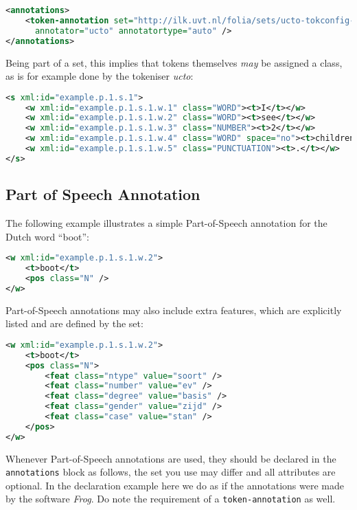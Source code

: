 \documentclass[a4paper,12pt]{report}
\begin{document}
\begin{lstlisting}[language=xml]
<annotations>
    <token-annotation set="http://ilk.uvt.nl/folia/sets/ucto-tokconfig-nl"
      annotator="ucto" annotatortype="auto" />
</annotations>
\end{lstlisting}

Being part of a set, this implies that tokens themselves \emph{may} be assigned a class, as is for example done by the tokeniser \emph{ucto}:

\begin{lstlisting}[language=xml]
<s xml:id="example.p.1.s.1">
    <w xml:id="example.p.1.s.1.w.1" class="WORD"><t>I</t></w>
    <w xml:id="example.p.1.s.1.w.2" class="WORD"><t>see</t></w>
    <w xml:id="example.p.1.s.1.w.3" class="NUMBER"><t>2</t></w>
    <w xml:id="example.p.1.s.1.w.4" class="WORD" space="no"><t>children</t></w>
    <w xml:id="example.p.1.s.1.w.5" class="PUNCTUATION"><t>.</t></w>
</s>
\end{lstlisting}        


\subsection{Part of Speech Annotation}

The following example illustrates a simple Part-of-Speech annotation for the Dutch word ``boot'':

\begin{lstlisting}[language=xml]
<w xml:id="example.p.1.s.1.w.2">
    <t>boot</t>
    <pos class="N" />
</w>
\end{lstlisting}

Part-of-Speech annotations may also include extra features, which are explicitly listed and are defined by the set:

\begin{lstlisting}[language=xml]
<w xml:id="example.p.1.s.1.w.2">
    <t>boot</t>
    <pos class="N">
        <feat class="ntype" value="soort" />
        <feat class="number" value="ev" />
        <feat class="degree" value="basis" />
        <feat class="gender" value="zijd" />
        <feat class="case" value="stan" />
    </pos>
</w>
\end{lstlisting}

Whenever Part-of-Speech annotations are used, they should be declared in the \texttt{annotations} block as follows, the set you use may differ and all attributes are optional. In the declaration example here we do as if the annotations were made by the software \emph{Frog}. Do note the requirement of a \texttt{token-annotation} as well.
\end{document}
